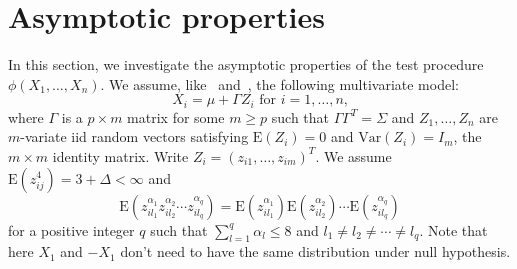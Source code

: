 \documentclass[review]{elsarticle}
\theoremstyle{plain}
\theoremstyle{definition}
\theoremstyle{remark}
\begin{document}
\section{Asymptotic properties}
In this section, we investigate the asymptotic properties of the test procedure $\phi(X_1,\ldots,X_n)$.
We assume, like~\cite{Chen2010A} and~\cite{Bai1996Efiect}, the following multivariate model:
\begin{equation}\label{chenC1}
    \textrm{$X_i=\mu+\Gamma Z_i$  for  $i=1,\ldots,n$,}
\end{equation}
where $\Gamma$ is a $p\times m$ matrix for some $m\geq p$ such that $\Gamma\Gamma^T=\Sigma$ and $Z_{1},\ldots, Z_n$ are $m$-variate iid random vectors satisfying $\mathrm{E}(Z_i)=0$ and $\mathrm{Var}(Z_i)=I_m$, the $m\times m$ identity matrix. Write $Z_i={(z_{i1},\ldots,z_{im})}^T$. We assume $\mathrm{E}(z_{ij}^4)=3+\Delta<\infty$ and
\begin{equation}\label{chenC2}
    \mathrm{E}(z_{il_1}^{\alpha_1}z_{il_2}^{\alpha_2}\cdots z_{il_q}^{\alpha_q})=\mathrm{E}(z_{il_1}^{\alpha_1})\mathrm{E}(z_{il_2}^{\alpha_2})\cdots \mathrm{E}(z_{il_q}^{\alpha_q})
\end{equation}
for a positive integer $q$ such that $\sum_{l=1}^q \alpha_l\leq 8$ and $l_1\neq l_2\neq \cdots \neq l_q$.
Note that here $X_1$ and $-X_1$ don't need to have the same distribution under null hypothesis.

\end{document}
